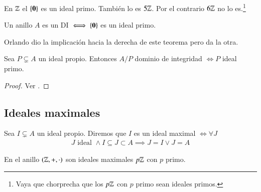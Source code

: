 \begin{ej}
	En $\mathbb{Z}$ el $\{\mathbf{0}\}$ es un ideal primo. También lo es $5\mathbb{Z}$. Por el contrario $6\mathbb{Z}$ no lo es.\footnote{Vaya que chorprecha que los $p\mathbb{Z}$ con $p$ primo sean ideales primos.}
\end{ej}

\begin{pro}
	Un anillo $A$ es un DI $\iff \{\mathbf{0}\}$ es un ideal primo.
\end{pro}

Orlando dio la implicación hacia la derecha de este teorema pero \cite{dor96} da la otra.

\begin{pro}
	Sea $P \subsetneq A$ un ideal propio. Entonces $A/P$ dominio de integridad $\iff P$ ideal primo.
\end{pro}

\begin{proof}Ver \cite[p.~201]{dor96}.
\end{proof}



\subsection{Ideales maximales}

\begin{dfn}
	Sea $I \subsetneq A$ un ideal propio. Diremos que $I$ es un ideal maximal $\iff \forall J$
	\begin{align*}
		J \text{ ideal } \land I \subseteq J \subset A \implies J = I \lor J = A
	\end{align*}
\end{dfn}

\begin{pro}
	En el anillo $(\mathbb{Z}, +, \cdot)$ son ideales maximales $p\mathbb{Z}$ con $p$ primo.
\end{pro}

